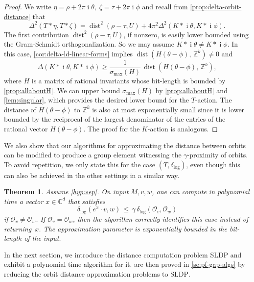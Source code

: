 \documentclass[10pt,a4paper]{article}
\newtheorem{theorem}{Theorem}[section]
\theoremstyle{definition}
\DeclareMathOperator{\poly}{poly}
\DeclareMathOperator{\ii}{i}
\DeclareMathOperator{\dist}{dist}
\newcommand{\distLD}{\delta_{\log}}
\newcommand{\CC}{\mathbb{C}}
\newcommand{\ZZ}{\mathbb{Z}}
\newcommand{\OO}{\ensuremath{\mathcal{O}}}
\numberwithin{equation}{section}
\begin{document}
\begin{proof}
We write $\eta=\rho+2\pi\ii\theta,\; \zeta=\tau+2\pi\ii\phi$
and recall from  \cref{prop:delta-orbit-distance} that
\[
 \Delta^2(T\ast\eta,T\ast\zeta) =
 \dist^2( \rho-\tau, U) + 4\pi^2 \Delta^2(K\ast \ii\theta, K\ast \ii\phi) .
\]
The first contribution $\dist^2( \rho-\tau, U)$,
if nonzero, is easily lower bounded %
using the Gram-Schmidt orthogonalization.
So we may assume $K\ast \ii\theta\neq K\ast \ii\phi$.
In this case, \cref{cor:delta-ld-linear-forms}
implies
$\dist(H(\theta - \phi),\, \ZZ^k)\ne 0$ and
\[
  \Delta(K\ast\ii\theta,K\ast\ii\phi)
     \geq \frac{1}{\sigma_{\max}(H)}\, \dist(H(\theta - \phi),\, \ZZ^k) ,
\]
where $H$ is a matrix of rational invariants whose bit-length is bounded by \cref{prop:allaboutH}.
We can upper bound $\sigma_{\max}(H)$
by \cref{prop:allaboutH} and \cref{lem:singular},
which provides the desired lower bound for the $T$-action.
The distance of $H(\theta-\phi)$ to $\ZZ^k$ is also at most exponentially small since it is lower bounded by the reciprocal of the largest denominator of the entries of the rational vector $H(\theta-\phi)$.
The proof for the $K$-action is analogous.
\end{proof}


We also show that our algorithms for approximating the distance between orbits
can be modified to produce a group element witnessing the $\gamma$-proximity of orbits.
To avoid repetition, we only state this for the case $(T,\distLD)$, even though
this can also be achieved in the other settings in a similar way.


\begin{theorem}\label{thm:rop-witness}
Assume \cref{hyp:sep}.
On input $M,v,w$,
one can compute in polynomial time a vector $x\in\CC^d$ that satisfies
\begin{equation}
\label{eq:rop-witness}
  \distLD( e^x\cdot v, w ) \, \leq \, \gamma \, \distLD(\OO_v,\OO_w)
\end{equation}
if $\OO_v\neq \OO_w$. If $\OO_v=\OO_w$,
then the algorithm correctly identifies this case instead of returning~$x$.
The approximation parameter is exponentially bounded in the
bit-length of the input.
\end{theorem}



In the next section, we introduce the distance computation problem \textsc{SLDP}
and exhibit a polynomial time algorithm for it.
 are then proved in \cref{se:pf-gap-algs} by
reducing the  orbit distance approximation problems to \textsc{SLDP}.
\end{document}
